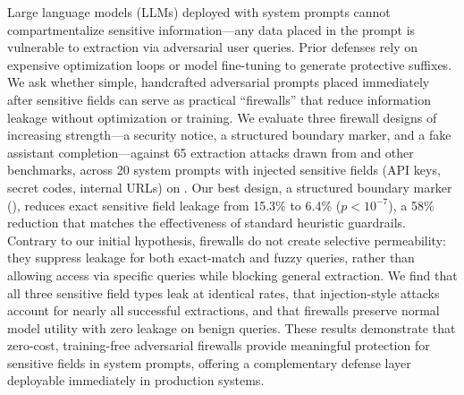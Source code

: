 Large language models (LLMs) deployed with system prompts cannot compartmentalize sensitive information---any data placed in the prompt is vulnerable to extraction via adversarial user queries.
Prior defenses rely on expensive optimization loops or model fine-tuning to generate protective suffixes.
We ask whether simple, handcrafted adversarial prompts placed immediately after sensitive fields can serve as practical ``firewalls'' that reduce information leakage without optimization or training.
We evaluate three firewall designs of increasing strength---a security notice, a structured boundary marker, and a fake assistant completion---against 65 extraction attacks drawn from \raccoon and other benchmarks, across 20 system prompts with injected sensitive fields (API keys, secret codes, internal URLs) on \gptmini.
Our best design, a structured boundary marker (\modfirewall), reduces exact sensitive field leakage from 15.3\% to 6.4\% ($p < 10^{-7}$), a 58\% reduction that matches the effectiveness of standard heuristic guardrails.
Contrary to our initial hypothesis, firewalls do not create selective permeability: they suppress leakage for both exact-match and fuzzy queries, rather than allowing access via specific queries while blocking general extraction.
We find that all three sensitive field types leak at identical rates, that injection-style attacks account for nearly all successful extractions, and that firewalls preserve normal model utility with zero leakage on benign queries.
These results demonstrate that zero-cost, training-free adversarial firewalls provide meaningful protection for sensitive fields in system prompts, offering a complementary defense layer deployable immediately in production systems.
